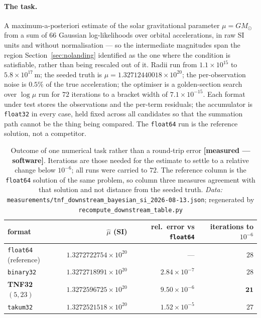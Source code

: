 \documentclass[11pt]{article}
\theoremstyle{definition}
\begin{document}
\paragraph{The task.} A maximum-a-posteriori estimate of the solar gravitational
parameter $\mu = GM_{\odot}$ from a sum of $66$ Gaussian log-likelihoods over
orbital accelerations, in raw SI units and without normalisation --- so the
intermediate magnitudes span the region Section~\ref{sec:nolanding} identified as
the one where the condition is satisfiable, rather than being rescaled out of it.
Radii run from $1.1\times 10^{15}$ to $5.8\times 10^{17}$\,m; the seeded truth is
$\mu = 1.32712440018\times 10^{20}$; the per-observation noise is $0.5\%$ of the
true acceleration; the optimiser is a golden-section search over $\log\mu$ run for
$72$ iterations to a bracket width of $7.1\times 10^{-15}$. Each format under test
stores the observations and the per-term residuals; the accumulator is
\texttt{float32} in every case, held fixed across all candidates so that the
summation path cannot be the thing being compared. The
\texttt{float64} run is the reference solution, not a competitor.

\begin{table}[t]\centering
\caption{Outcome of one numerical task rather than a round-trip error
\textbf{[measured --- software]}. Iterations are those needed for the estimate to
settle to a relative change below $10^{-6}$; all runs were carried to $72$.
The reference column is the \texttt{float64} solution of the same problem, so
column three measures agreement with that solution and not distance from the
seeded truth. \emph{Data:} \texttt{measurements/tnf\_downstream\_bayesian\_si\_2026-08-13.json}; regenerated by \texttt{recompute\_downstream\_table.py}}
\label{tab:downstream}
\begin{tabular}{lrrr}
\toprule
format & $\hat\mu$ (SI) & rel.\ error vs \texttt{float64} & iterations to $10^{-6}$ \\
\midrule
\texttt{float64} (reference) & $1.3272722754\times 10^{20}$ & --- & $28$ \\
\texttt{binary32}            & $1.3272718991\times 10^{20}$ & $2.84\times 10^{-7}$ & $28$ \\
\textbf{TNF32 $(5,23)$}      & $1.3272596725\times 10^{20}$ & $9.50\times 10^{-6}$ & $\mathbf{21}$ \\
\texttt{takum32}             & $1.3272521518\times 10^{20}$ & $1.52\times 10^{-5}$ & $27$ \\
\bottomrule
\end{tabular}
\end{table}
\end{document}
